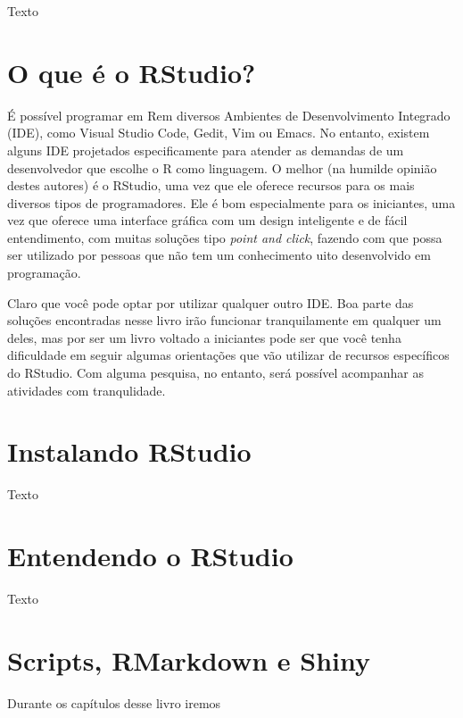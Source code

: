 \documentclass[
]{book}
\begin{document}
Texto

\hypertarget{o-que-uxe9-o-rstudio}{%
\section{O que é o RStudio?}\label{o-que-uxe9-o-rstudio}}

É possível programar em Rem diversos Ambientes de Desenvolvimento Integrado (IDE), como Visual Studio Code, Gedit, Vim ou Emacs. No entanto, existem alguns IDE projetados especificamente para atender as demandas de um desenvolvedor que escolhe o R como linguagem. O melhor (na humilde opinião destes autores) é o RStudio, uma vez que ele oferece recursos para os mais diversos tipos de programadores. Ele é bom especialmente para os iniciantes, uma vez que oferece uma interface gráfica com um design inteligente e de fácil entendimento, com muitas soluções tipo \emph{point and click}, fazendo com que possa ser utilizado por pessoas que não tem um conhecimento uito desenvolvido em programação.

Claro que você pode optar por utilizar qualquer outro IDE. Boa parte das soluções encontradas nesse livro irão funcionar tranquilamente em qualquer um deles, mas por ser um livro voltado a iniciantes pode ser que você tenha dificuldade em seguir algumas orientações que vão utilizar de recursos específicos do RStudio. Com alguma pesquisa, no entanto, será possível acompanhar as atividades com tranqulidade.

\hypertarget{instalando-rstudio}{%
\section{Instalando RStudio}\label{instalando-rstudio}}

Texto

\hypertarget{entendendo-o-rstudio}{%
\section{Entendendo o RStudio}\label{entendendo-o-rstudio}}

Texto

\hypertarget{scripts-rmarkdown-e-shiny}{%
\section{Scripts, RMarkdown e Shiny}\label{scripts-rmarkdown-e-shiny}}

Durante os capítulos desse livro iremos
\end{document}
